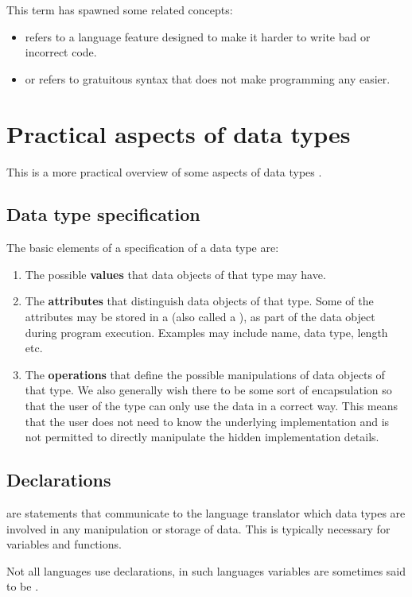 This term has spawned some related concepts:
\begin{itemize}
\item {} refers to a language feature designed to make it harder to write bad or incorrect code.
\item {} or  refers to gratuitous syntax that does not make programming any easier.
\end{itemize}

\section{Practical aspects of data types}
This is a more practical overview of some aspects of data types .
\subsection{Data type specification}
The basic elements of a specification of a data type are:
\begin{enumerate}
\item The possible \textbf{values} that data objects of that type may have.
\item The \textbf{attributes} that distinguish data objects of that type. Some of the attributes may be stored in a  (also called a ), as part of the data object during program execution. Examples may include name, data type, length etc.
\item The \textbf{operations} that define the possible manipulations of data objects of that type. We also generally wish there to be some sort of encapsulation so that the user of the type can only use the data in a correct way. This means that the user does not need to know the underlying implementation and is not permitted to directly manipulate the hidden implementation details.
\end{enumerate}

\subsection{Declarations}
 are statements that communicate to the language translator which data types are involved in any manipulation or storage of data. This is typically necessary for variables and functions.

Not all languages use declarations, in such languages variables are sometimes said to be .


